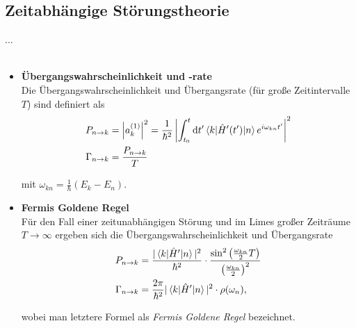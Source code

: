 \documentclass{article}
\newcommand{\diff}{\mathrm{d}}
\newcommand{\lr}[1]{\left(#1\right)}
\begin{document}
\subsection{Zeitabhängige Störungstheorie}
...\\
\\
	\begin{itemize}
		\item \textbf{Übergangswahrscheinlichkeit und -rate}\\
		Die Übergangswahrscheinlichkeit und Übergangsrate (für große Zeitintervalle $T$) sind definiert als
			\begin{align}
				P_{n\to k} &= \left| a_k^{(1)} \right|^2 = \frac{1}{\hbar^2} \left| \int_{t_0}^t \diff t' \braket{k | \hat{H}'(t') | n} e^{i \omega_{kn}t'} \right|^2 \\
				\Gamma_{n\to k} &= \frac{P_{n\to k}}{T}
			\end{align}
		
		mit $\omega_{kn} = \frac{1}{\hbar}(E_k - E_n)$.

	
		\item \textbf{Fermis Goldene Regel}\\
		Für den Fall einer zeitunabhängigen Störung und im Limes großer Zeiträume $T \to \infty$ ergeben sich die Übergangswahrscheinlichkeit und Übergangsrate
			\begin{align}
				P_{n \to k} &= \frac{| \braket{ k | \hat{H}' | n } |^2}{\hbar^2} \cdot \frac{\sin^2\lr{ \frac{\omega_{kn}}{2}T }}{ \lr{ \frac{\omega_{kn}}{2} }^2 } \\
				\Gamma_{n \to k} &= \frac{2\pi}{\hbar^2} | \braket{ k | \hat{H}' | n } |^2 \cdot \rho(\omega_n) ,
			\end{align}
		
		wobei man letztere Formel als \textit{Fermis Goldene Regel} bezeichnet.
	\end{itemize}




\newpage
\end{document}
